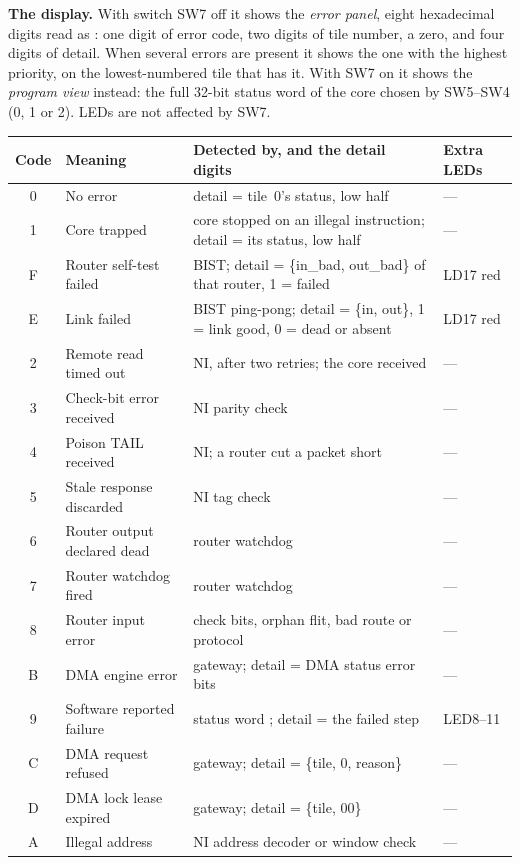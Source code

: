 \documentclass[11pt,a4paper]{article}
\newcommand{\code}[1]{\texttt{\detokenize{#1}}}
\begin{document}
\textbf{The display.} With switch SW7 off it shows the \emph{error panel},
eight hexadecimal digits read as \code{C TT 0 DDDD}: one digit of error code,
two digits of tile number, a zero, and four digits of detail. When several
errors are present it shows the one with the highest priority, on the
lowest-numbered tile that has it. With SW7 on it shows the \emph{program view}
instead: the full 32-bit status word of the core chosen by SW5--SW4 (0, 1 or
2). LEDs are not affected by SW7.

\begin{tabularx}{\textwidth}{@{}clYl@{}}
\toprule
\textbf{Code} & \textbf{Meaning} & \textbf{Detected by, and the detail digits}
& \textbf{Extra LEDs} \\
 & No error & detail = tile~0's status, low half & --- \\
1 & Core trapped & core stopped on an illegal instruction; detail = its
status, low half & --- \\
F & Router self-test failed & BIST; detail = \{in\_bad, out\_bad\} of that
router, 1 = failed & LD17 red \\
E & Link failed & BIST ping-pong; detail = \{in, out\}, 1 = link good,
0 = dead or absent & LD17 red \\
2 & Remote read timed out & NI, after two retries; the core received
\code{DEADBEEF} & --- \\
3 & Check-bit error received & NI parity check & --- \\
4 & Poison TAIL received & NI; a router cut a packet short & --- \\
5 & Stale response discarded & NI tag check & --- \\
6 & Router output declared dead & router watchdog & --- \\
7 & Router watchdog fired & router watchdog & --- \\
8 & Router input error & check bits, orphan flit, bad route or protocol & --- \\
B & DMA engine error & gateway; detail = DMA status error bits & --- \\
9 & Software reported failure & status word \code{FA11xxxx}; detail = the
failed step & LED8--11 \\
C & DMA request refused & gateway; detail = \{tile, 0, reason\} & --- \\
D & DMA lock lease expired & gateway; detail = \{tile, 00\} & --- \\
A & Illegal address & NI address decoder or window check & --- \\
\bottomrule
\end{tabularx}
\end{document}
